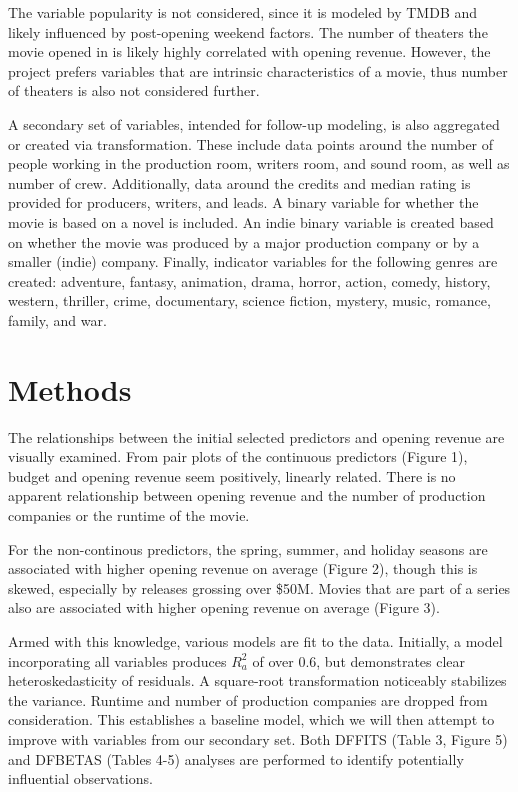 \documentclass[10pt]{article}
\begin{document}
The variable popularity is not considered, since it is modeled by TMDB and likely influenced by post-opening weekend factors. The number of theaters the movie opened in is likely highly correlated with opening revenue. However, the project prefers variables that are intrinsic characteristics of a movie, thus number of theaters is also not considered further. 

A secondary set of variables, intended for follow-up modeling, is also aggregated or created via transformation. These include data points around the number of people working in the production room, writers room, and sound room, as well as number of crew. Additionally, data around the credits and median rating is provided for producers, writers, and leads. A binary variable for whether the movie is based on a novel is included. An indie binary variable is created based on whether the movie was produced by a major production company or by a smaller (indie) company. Finally, indicator variables for the following genres are created: adventure, fantasy, animation, drama, horror, action, comedy, history, western, thriller, crime, documentary, science fiction, mystery, music, romance, family, and war.

\section{Methods}
The relationships between the initial selected predictors and opening revenue are visually examined. From pair plots of the continuous predictors (Figure 1), budget and opening revenue seem positively, linearly related. There is no apparent relationship between opening revenue and the number of production companies or the runtime of the movie. 

For the non-continous predictors, the spring, summer, and holiday seasons are associated with higher opening revenue on average (Figure 2), though this is skewed, especially by releases grossing over \$50M. Movies that are part of a series also are associated with higher opening revenue on average (Figure 3). 

Armed with this knowledge, various models are fit to the data. Initially, a model incorporating all variables produces $R^2_a$ of over 0.6, but demonstrates clear heteroskedasticity of residuals. A square-root transformation noticeably stabilizes the variance. Runtime and number of production companies are dropped from consideration. This establishes a baseline model, which we will then attempt to improve with variables from our secondary set.  Both DFFITS (Table 3, Figure 5) and DFBETAS (Tables 4-5) analyses are performed to identify potentially influential observations.
\end{document}
